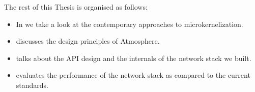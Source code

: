 The rest of this Thesis is organised as follows: 

\begin{itemize}
    \item{In  we take a look at the contemporary approaches to microkernelization. }
    \item{ discusses the design principles of Atmosphere.}
    \item{ talks about the API design and the internals of the network stack we built.  }
    \item{ evaluates the performance of the network stack as compared to the current standards.}
\end{itemize}
